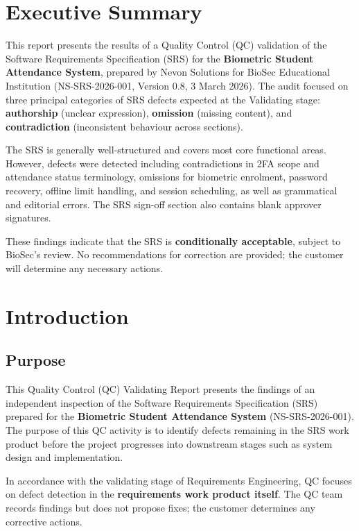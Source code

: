 \documentclass[11pt,a4paper]{article}
\begin{document}
\bigskip

\section{Executive Summary}

This report presents the results of a Quality Control (QC) validation of the Software Requirements Specification (SRS) for the \textbf{Biometric Student Attendance System}, prepared by Nevon Solutions for BioSec Educational Institution (NS-SRS-2026-001, Version 0.8, 3 March 2026). The audit focused on three principal categories of SRS defects expected at the Validating stage: \textbf{authorship} (unclear expression), \textbf{omission} (missing content), and \textbf{contradiction} (inconsistent behaviour across sections).

The SRS is generally well-structured and covers most core functional areas. However, defects were detected including contradictions in 2FA scope and attendance status terminology, omissions for biometric enrolment, password recovery, offline limit handling, and session scheduling, as well as grammatical and editorial errors. The SRS sign-off section also contains blank approver signatures.

These findings indicate that the SRS is \textbf{conditionally acceptable}, subject to BioSec's review. No recommendations for correction are provided; the customer will determine any necessary actions.

\section{Introduction}

\subsection{Purpose}
This Quality Control (QC) Validating Report presents the findings of an independent inspection of the Software Requirements Specification (SRS) prepared for the \textbf{Biometric Student Attendance System} (NS-SRS-2026-001). The purpose of this QC activity is to identify defects remaining in the SRS work product before the project progresses into downstream stages such as system design and implementation.

In accordance with the validating stage of Requirements Engineering, QC focuses on defect detection in the \textbf{requirements work product itself}. The QC team records findings but does not propose fixes; the customer determines any corrective actions.
\end{document}
